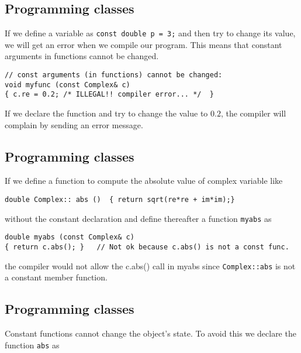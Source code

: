 \documentclass[%
oneside,                 %
final,                   %
10pt]{article}
\begin{document}
\subsection*{Programming classes}

If we define a variable as
\Verb!const double p = 3;! and then try to change its value, we will get an error when we
compile our program. This means that constant arguments in functions cannot be changed.

\begin{verbatim}
// const arguments (in functions) cannot be changed:
void myfunc (const Complex& c)
{ c.re = 0.2; /* ILLEGAL!! compiler error... */  }
\end{verbatim}
If we declare the function and try to change the value to $0.2$, the compiler will complain by sending
an error message.

\subsection*{Programming classes}

If we define a function to compute the absolute value of complex variable like

\begin{verbatim}
double Complex:: abs ()  { return sqrt(re*re + im*im);}
\end{verbatim}
without the constant declaration  and define thereafter a function
\Verb!myabs! as

\begin{verbatim}
double myabs (const Complex& c)
{ return c.abs(); }   // Not ok because c.abs() is not a const func.
\end{verbatim}
the compiler would not allow the c.abs() call in myabs
since \Verb!Complex::abs! is not a constant member function.

\subsection*{Programming classes}

Constant functions cannot change the object's state.
To avoid this we declare the function \Verb!abs! as
\end{document}

